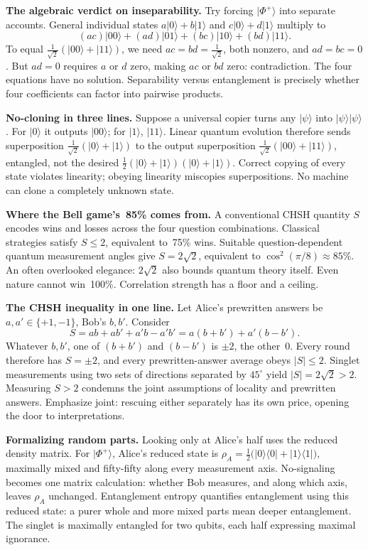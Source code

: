 \begin{mathbridge}
\textbf{The algebraic verdict on inseparability.} Try forcing \(|\Phi^{+}\rangle\) into separate accounts. General individual states \(a|0\rangle+b|1\rangle\) and \(c|0\rangle+d|1\rangle\) multiply to
\[
(ac)|00\rangle+(ad)|01\rangle+(bc)|10\rangle+(bd)|11\rangle .
\]
To equal \(\tfrac{1}{\sqrt2}(|00\rangle+|11\rangle)\), we need \(ac=bd=\tfrac{1}{\sqrt2}\), both nonzero, and \(ad=bc=0\). But \(ad=0\) requires \(a\) or \(d\) zero, making \(ac\) or \(bd\) zero: contradiction. The four equations have no solution. Separability versus entanglement is precisely whether four coefficients can factor into pairwise products.

\textbf{No-cloning in three lines.} Suppose a universal copier turns any \(|\psi\rangle\) into \(|\psi\rangle|\psi\rangle\). For \(|0\rangle\) it outputs \(|00\rangle\); for \(|1\rangle\), \(|11\rangle\). Linear quantum evolution therefore sends superposition \(\tfrac{1}{\sqrt2}(|0\rangle+|1\rangle)\) to the output superposition \(\tfrac{1}{\sqrt2}(|00\rangle+|11\rangle)\), entangled, not the desired \(\tfrac12(|0\rangle+|1\rangle)(|0\rangle+|1\rangle)\). Correct copying of every state violates linearity; obeying linearity miscopies superpositions. No machine can clone a completely unknown state.

\textbf{Where the Bell game's~85\% comes from.} A conventional CHSH quantity \(S\) encodes wins and losses across the four question combinations. Classical strategies satisfy \(S\leq2\), equivalent to~75\% wins. Suitable question-dependent quantum measurement angles give \(S=2\sqrt2\), equivalent to \(\cos^2(\pi/8)\approx85\%\). An often overlooked elegance: \(2\sqrt2\) also bounds quantum theory itself. Even nature cannot win~100\%. Correlation strength has a floor and a ceiling.
\end{mathbridge}

\begin{challenge}
\textbf{The CHSH inequality in one line.} Let Alice's prewritten answers be \(a,a'\in\{+1,-1\}\), Bob's \(b,b'\). Consider
\[
S=ab+ab'+a'b-a'b'=a(b+b')+a'(b-b').
\]
Whatever \(b,b'\), one of \((b+b')\) and \((b-b')\) is \(\pm2\), the other~0. Every round therefore has \(S=\pm2\), and every prewritten-answer average obeys \(|S|\leq2\). Singlet measurements using two sets of directions separated by \(45^\circ\) yield \(|S|=2\sqrt2>2\). Measuring \(S>2\) condemns the joint assumptions of locality and prewritten answers. Emphasize joint: rescuing either separately has its own price, opening the door to interpretations.

\textbf{Formalizing random parts.} Looking only at Alice's half uses the reduced density matrix. For \(|\Phi^{+}\rangle\), Alice's reduced state is \(\rho_A=\tfrac12\big(|0\rangle\langle0|+|1\rangle\langle1|\big)\), maximally mixed and fifty-fifty along every measurement axis. No-signaling becomes one matrix calculation: whether Bob measures, and along which axis, leaves \(\rho_A\) unchanged. Entanglement entropy quantifies entanglement using this reduced state: a purer whole and more mixed parts mean deeper entanglement. The singlet is maximally entangled for two qubits, each half expressing maximal ignorance.
\end{challenge}

